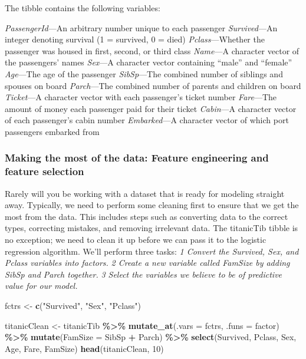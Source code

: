 \documentclass[
]{article}
\newenvironment{Shaded}{\begin{snugshade}}{\end{snugshade}}
\newcommand{\AttributeTok}[1]{\textcolor[rgb]{0.13,0.29,0.53}{#1}}
\newcommand{\DecValTok}[1]{\textcolor[rgb]{0.00,0.00,0.81}{#1}}
\newcommand{\FunctionTok}[1]{\textcolor[rgb]{0.13,0.29,0.53}{\textbf{#1}}}
\newcommand{\NormalTok}[1]{#1}
\newcommand{\OtherTok}[1]{\textcolor[rgb]{0.56,0.35,0.01}{#1}}
\newcommand{\SpecialCharTok}[1]{\textcolor[rgb]{0.81,0.36,0.00}{\textbf{#1}}}
\newcommand{\StringTok}[1]{\textcolor[rgb]{0.31,0.60,0.02}{#1}}
\begin{document}
The tibble contains the following variables:

\emph{PassengerId}---An arbitrary number unique to each passenger
\emph{Survived}---An integer denoting survival (1 = survived, 0 = died)
\emph{Pclass}---Whether the passenger was housed in first, second, or
third class \emph{Name}---A character vector of the passengers' names
\emph{Sex}---A character vector containing ``male'' and ``female''
\emph{Age}---The age of the passenger \emph{SibSp}---The combined number
of siblings and spouses on board \emph{Parch}---The combined number of
parents and children on board \emph{Ticket}---A character vector with
each passenger's ticket number \emph{Fare}---The amount of money each
passenger paid for their ticket \emph{Cabin}---A character vector of
each passenger's cabin number \emph{Embarked}---A character vector of
which port passengers embarked from

\subsubsection{Making the most of the data: Feature engineering and
feature
selection}\label{making-the-most-of-the-data-feature-engineering-and-feature-selection}

Rarely will you be working with a dataset that is ready for modeling
straight away. Typically, we need to perform some cleaning first to
ensure that we get the most from the data. This includes steps such as
converting data to the correct types, correcting mistakes, and removing
irrelevant data. The titanicTib tibble is no exception; we need to clean
it up before we can pass it to the logistic regression algorithm. We'll
perform three tasks: \emph{1 Convert the Survived, Sex, and Pclass
variables into factors.} \emph{2 Create a new variable called FamSize by
adding SibSp and Parch together.} \emph{3 Select the variables we
believe to be of predictive value for our model.}

\begin{Shaded}
\begin{Highlighting}[]
\NormalTok{fctrs }\OtherTok{\textless{}{-}} \FunctionTok{c}\NormalTok{(}\StringTok{"Survived"}\NormalTok{, }\StringTok{"Sex"}\NormalTok{, }\StringTok{"Pclass"}\NormalTok{)}

\NormalTok{titanicClean }\OtherTok{\textless{}{-}}\NormalTok{ titanicTib }\SpecialCharTok{\%\textgreater{}\%}
  \FunctionTok{mutate\_at}\NormalTok{(}\AttributeTok{.vars =}\NormalTok{ fctrs, }\AttributeTok{.funs =}\NormalTok{ factor) }\SpecialCharTok{\%\textgreater{}\%}
  \FunctionTok{mutate}\NormalTok{(}\AttributeTok{FamSize =}\NormalTok{ SibSp }\SpecialCharTok{+}\NormalTok{ Parch) }\SpecialCharTok{\%\textgreater{}\%}
  \FunctionTok{select}\NormalTok{(Survived, Pclass, Sex, Age, Fare, FamSize)}
\FunctionTok{head}\NormalTok{(titanicClean, }\DecValTok{10}\NormalTok{)}
\end{Highlighting}
\end{Shaded}
\end{document}
